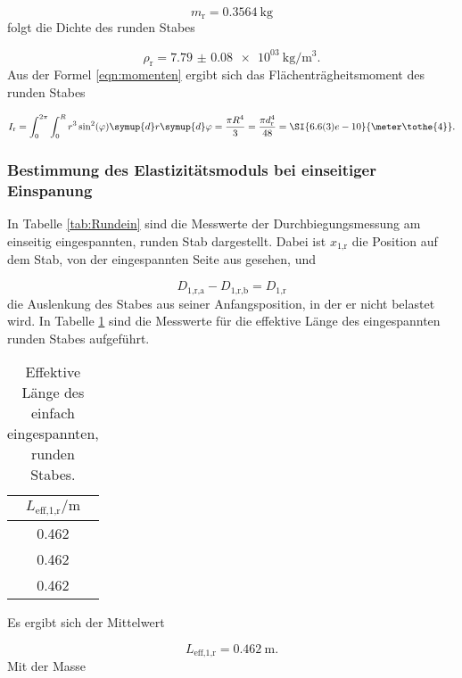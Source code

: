 \begin{equation}
  m_\text{r} = \SI{0.3564}{\kilo\gram}
\end{equation}
folgt die Dichte des runden Stabes

\begin{equation}
  \rho_\text{r} = \SI{7.79(8)e03}{\kilo\gram\per\cubic\meter}.
\end{equation}
Aus der Formel \eqref{eqn:momenten} ergibt sich das Flächenträgheitsmoment des runden
Stabes

\begin{equation}
  I_\text{r} = \int_{0}^{2\pi}\int_{0}^{R} r^3 \sin^2(\varphi) \symup{d}r
  \symup{d}\varphi = \frac{\pi R^4}{3} = \frac{\pi d_\text{r}^4}{48} =
  \SI{6.6(3)e-10}{\meter\tothe{4}}.
\end{equation}
\subsubsection{Bestimmung des Elastizitätsmoduls bei einseitiger Einspanung}

In Tabelle \ref{tab:Rundein} sind die Messwerte der Durchbiegungsmessung am
einseitig eingespannten, runden Stab dargestellt.
Dabei ist $x_\text{1,r}$ die Position auf dem Stab, von der eingespannten Seite
aus gesehen, und

\begin{equation}
  D_\text{1,r,a} - D_\text{1,r,b} = D_\text{1,r}
\end{equation}
die Auslenkung des Stabes aus seiner Anfangsposition, in der er nicht belastet
wird. In Tabelle \ref{tab:Rundeinleff} sind die Messwerte für die effektive
Länge des eingespannten runden Stabes aufgeführt.

\begin{table}[H]
  \centering
  \caption{Effektive Länge des einfach eingespannten, runden Stabes.}
  \label{tab:Rundeinleff}
  \begin{tabular}{c}
    \toprule
    $L_\text{eff,1,r}/\si{\meter}$ \\
    \midrule
    0.462 \\
    0.462 \\
    0.462 \\
    \bottomrule
  \end{tabular}
\end{table}

Es ergibt sich der Mittelwert

\begin{equation}
  L_\text{eff,1,r} = \SI{0.462}{\meter}.
\end{equation}
Mit der Masse

